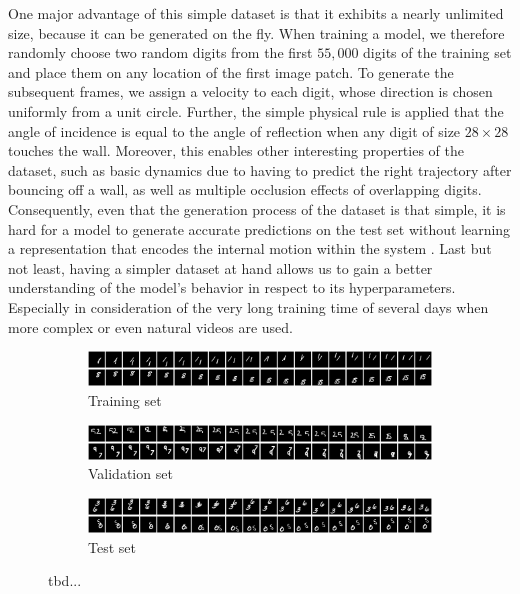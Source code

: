 One major advantage of this simple dataset is that it exhibits a nearly unlimited size, because it can be generated on the fly. When training a model, we therefore randomly choose two random digits from the first $55,000$ digits of the training set and place them on any location of the first image patch. To generate the subsequent frames, we assign a velocity to each digit, whose direction is chosen uniformly from a unit circle. Further, the simple physical rule is applied that the angle of incidence is equal to the angle of reflection when any digit of size $ 28 \times 28 $ touches the wall. Moreover, this enables other interesting properties of the dataset, such as basic dynamics due to having to predict the right trajectory after bouncing off a wall, as well as multiple occlusion effects of overlapping digits. Consequently, even that the generation process of the dataset is that simple, it is hard for a model to generate accurate predictions on the test set without learning a representation that encodes the internal motion within the system \parencite[p. 6]{conv_lstm_nowcasting}. Last but not least, having a simpler dataset at hand allows us to gain a better understanding of the model's behavior in respect to its hyperparameters. Especially in consideration of the very long training time of several days when more complex or even natural videos are used.

\begin{figure}[htpb]
\centering
\begin{subfigure}{1.0\textwidth}
  \centering
  \includegraphics[width=1.0\linewidth]{figures/ds/mm_train.png}
  \caption{Training set}
  \label{fig:mm_train}
  \vspace{.1cm}
\end{subfigure}
\begin{subfigure}{1.0\textwidth}
  \centering
  \includegraphics[width=1.0\linewidth]{figures/ds/mm_valid.png}
  \caption{Validation set}
  \label{fig:mm_valid}
  \vspace{.1cm}
\end{subfigure}
\begin{subfigure}{1.0\textwidth}
  \centering
  \includegraphics[width=1.0\linewidth]{figures/ds/mm_test.png}
  \caption{Test set}
  \label{fig:mm_test}
\end{subfigure}
\caption[MovingMNIST Image Sequence Samples]{tbd...}
\label{fig:moving_mnist}
\end{figure}


